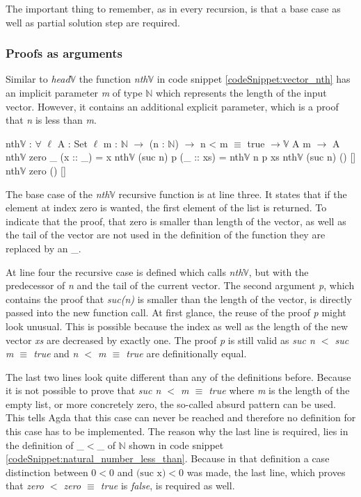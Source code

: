 The important thing to remember, as in every recursion, is that a base case as well as partial solution step are required.

\subsubsection{Proofs as arguments}

Similar to \emph{head$\mathbb{V}$} the function \emph{nth$\mathbb{V}$} in code snippet \ref{codeSnippet:vector_nth} has an implicit parameter \emph{m} of type $\mathbb{N}$ which represents the length of the input vector. 
However, it contains an additional explicit parameter, which is a proof that \emph{n} is less than \emph{m}.

\begin{codesnippet}[mathescape=true, caption={Definition of \emph{nth} function in Agda}, label={codeSnippet:vector_nth}]
nth$\mathbb{V}$ : $\forall$ {$\ell$} {A : Set $\ell$} {m : $\mathbb{N}$} $\rightarrow$
       (n : $\mathbb{N}$) $\rightarrow$ n < m $\equiv$ true $\rightarrow \mathbb{V}$ A m $\rightarrow$ A
nth$\mathbb{V}$ zero _ (x :: _) = x
nth$\mathbb{V}$ (suc n) p (_ :: xs) = nth$\mathbb{V}$ n p xs
nth$\mathbb{V}$ (suc n) () []
nth$\mathbb{V}$ zero () []
\end{codesnippet}

The base case of the \emph{nth$\mathbb{V}$} recursive function is at line three. It states that if the element at index zero is wanted, the first element of the list is returned.
To indicate that the proof, that zero is smaller than length of the vector, as well as the tail of the vector are not used in the definition of the function they are replaced by an \_.

At line four the recursive case is defined which calls \emph{nth$\mathbb{V}$}, but with the predecessor of \emph{n} and the tail of the current vector.
The second argument \emph{p}, which contains the proof that \emph{suc(n)} is smaller than the length of the vector, is directly passed into the new function call. 
At first glance, the reuse of the proof \emph{p} might look unusual. 
This is possible because the index as well as the length of the new vector \emph{xs} are decreased by exactly one.
The proof \emph{p} is still valid as \emph{suc n $<$ suc m $\equiv$ true} and \emph{n $<$ m $\equiv$ true} are definitionally equal.

The last two lines look quite different than any of the definitions before.
Because it is not possible to prove that \emph{suc n $<$ m $\equiv$ true} where \emph{m} is the length of the empty list, or more concretely zero, the so-called absurd pattern can be used. 
This tells Agda that this case can never be reached and therefore no definition for this case has to be implemented.
The reason why the last line is required, lies in the definition of \_$<$\_ of $\mathbb{N}$ shown in code snippet \ref{codeSnippet:natural_number_less_than}.
Because in that definition a case distinction between $0 < 0$ and $\text{(suc x)} < 0$ was made, the last line, which proves that \emph{zero $<$ zero $\equiv$ true} is \emph{false}, is required as well.

